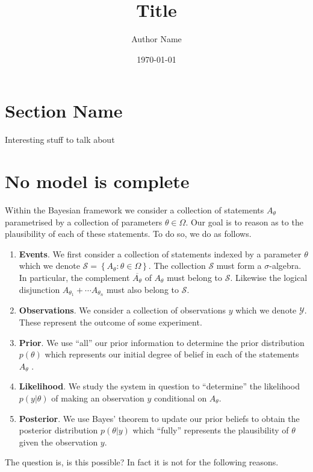 \documentclass[
    a4paper,
    DIV=14,
    abstract=true,
    numbers=noenddot
]
{scrartcl}
\theoremstyle{definition}
\newcommand{\set}[1]{\left\{#1\right\}}
\newcommand{\Ss}{\mathcal{S}}
\newcommand{\Yy}{\mathcal{Y}}
\begin{document}
\title{Title}
\author{Author Name}
\date{\today}
\maketitle
\section{Section Name}
Interesting stuff to talk about
\section{No model is complete}
Within the Bayesian framework we consider a collection of statements $A_ \theta$ parametrised by a collection of parameters $\theta \in \Omega$. Our goal is to reason as to the plausibility of each of these statements. To do so, we do as follows.
\begin{enumerate}
    \item \textbf{Events}. We first consider a collection of statements indexed by a parameter $\theta $ which we denote $\Ss = \set{A_\theta: \theta \in \Omega}$. The collection $\Ss $ must form a $\sigma $-algebra. In particular, the complement $\overline{A_\theta }$ of $A_\theta $ must belong to $\Ss $. Likewise the logical disjunction $A_{\theta _1}+ \cdots A_{\theta _n}$ must also belong to $\Ss $.
    \item \textbf{Observations}. We consider a collection of observations $y$ which we denote $\Yy $. These represent the outcome of some experiment.
    \item \textbf{Prior}.   We use ``all'' our prior information to determine the prior distribution $p(\theta )$ which represents our initial degree of belief in each of the statements $A_\theta $ .
    \item \textbf{Likelihood}.   We study the system in question to ``determine'' the likelihood $p(y| \theta )$ of making an observation $y$ conditional on $A_\theta$.
    \item \textbf{Posterior}.  We use Bayes' theorem to update our prior beliefs to obtain the posterior distribution $p(\theta |y)$ which ``fully'' represents the plausibility of $\theta $ given the observation $y$.
\end{enumerate}
The question is, is this possible? In fact it is not for the following reasons.
\end{document}

